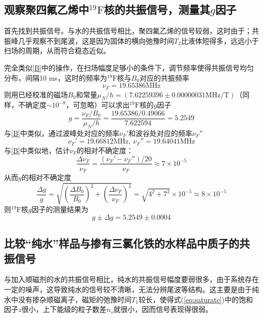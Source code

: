 \documentclass[aps,pre,12pt,preprint,onecolumn,showpacs,showkeys]{revtex4-1}
\def \F {^{19}\mathrm{F}}
\begin{document}
\subsection{观察聚四氟乙烯中$\F$核的共振信号，测量其$g$因子}
首先找到共振信号。与水的共振信号相比，聚四氟乙烯的信号较弱，这时由于；共振峰几乎观察不到尾波，这是因为固体的横向弛豫时间$T_2$比液体短得多，远远小于扫场的周期，从而符合稳态近似。

完全类似\ref{B}中的操作，在扫场幅度足够小的条件下，调节频率使得共振信号均匀分布，间隔10 ms，这时的频率为$\F$核与$B_0$对应的共振频率
\begin{equation}
\nu _F =19.65386 \mathrm{MHz}
\end{equation}
则用已经校准的磁场$B_0$和常量$\mu_N / h=(7.62259396 \pm 0.00000031 \mathrm{MHz/T})$（同样，不确定度$\sim 10^{-8}$，可忽略）可以求出$\F$核的$g$因子
\begin{equation}
g=\frac{\nu_F / B_0}{\mu_N / h}=\frac{19.65386/0.49066}{7.622594}=5.2549
\end{equation}
与\ref{B}中类似，通过波峰处对应的频率$\nu_F'$和波谷处对应的频率$\nu_F''$
\begin{equation}
\nu_F'=19.66812\mathrm{MHz},\ \nu_F''=19.64041\mathrm{MHz}
\end{equation}
与\ref{B}中类似地，估计$\nu_F$的相对不确定度：
\begin{equation}
\frac{\Delta \nu_F}{\nu_F}=\frac{(\nu_F'-\nu_F'')/20}{\nu_F}\approx 7\times 10^{-5}
\end{equation}
从而$g$的相对不确定度
\begin{equation}
\frac{\Delta g}{g}=\sqrt{\left(\frac{\Delta B_0}{B_0}\right)^2+\left(\frac{\Delta \nu_F}{\nu_F}\right)^2}=\sqrt{4^2+7^2}\times 10 ^{-5}\approx8\times 10 ^{-5}
\end{equation}
则$\F$核$g$因子的测量结果为
\begin{equation}
g\pm\Delta g =5.2549\pm0.0004
\end{equation}
\subsection{比较“纯水”样品与掺有三氯化铁的水样品中质子的共振信号}
与加入顺磁剂的水的共振信号相比，纯水的共振信号幅度要弱很多，由于系统存在一定的噪声，这导致纯水的信号较不清晰，无法分辨尾波等结构。这主要是由于纯水中没有掺杂顺磁离子，磁矩的弛豫时间$T_1$较长，使得式(\ref{eq:saturate})中的饱和因子$z$很小，上下能级的粒子数差$n_s$就很小，因而信号表现得很弱。
\end{document}
